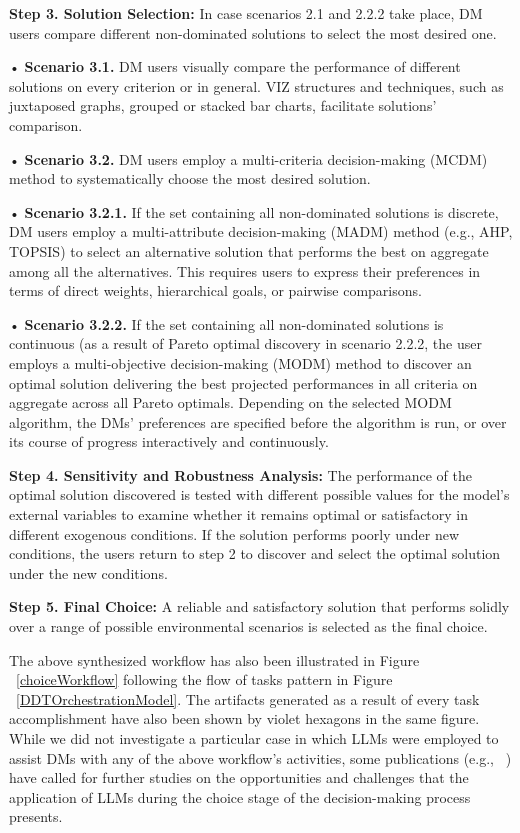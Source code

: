 \documentclass{sfuthesis}
\begin{document}
\textbf{Step 3. Solution Selection:} In case scenarios 2.1 and 2.2.2 take place, DM users compare different non-dominated solutions to select the most desired one.\par
{
\setlength{\leftskip}{0.5cm}
\noindent•	\textbf{Scenario 3.1.} DM users visually compare the performance of different solutions on every criterion or in general. VIZ structures and techniques, such as juxtaposed graphs, grouped or stacked bar charts, facilitate solutions' comparison.\par
\noindent•	\textbf{Scenario 3.2.} DM users employ a multi-criteria decision-making (MCDM) method to systematically choose the most desired solution.\par
}
{
\setlength{\leftskip}{1cm}
\noindent•	\textbf{Scenario 3.2.1.} If the set containing all non-dominated solutions is discrete, DM users employ a multi-attribute decision-making (MADM) method (e.g., AHP, TOPSIS) to select an alternative solution that performs the best on aggregate among all the alternatives. This requires users to express their preferences in terms of direct weights, hierarchical goals, or pairwise comparisons.\par
\noindent•	\textbf{Scenario 3.2.2.} If the set containing all non-dominated solutions is continuous (as a result of Pareto optimal discovery in scenario 2.2.2, the user employs a multi-objective decision-making (MODM) method to discover an optimal solution delivering the best projected performances in all criteria on aggregate across all Pareto optimals. Depending on the selected MODM algorithm, the DMs' preferences are specified before the algorithm is run, or over its course of progress interactively and continuously.\par
}
\textbf{Step 4. Sensitivity and Robustness Analysis:} The performance of the optimal solution discovered is tested with different possible values for the model's external variables to examine whether it remains optimal or satisfactory in different exogenous conditions. If the solution performs poorly under new conditions, the users return to step 2 to discover and select the optimal solution under the new conditions. \par  
\textbf{Step 5. Final Choice:} A reliable and satisfactory solution that performs solidly over a range of possible environmental scenarios is selected as the final choice.\par
The above synthesized workflow has also been illustrated in Figure ~\ref{choiceWorkflow} following the flow of tasks pattern in Figure ~\ref{DDTOrchestrationModel}. The artifacts generated as a result of every task accomplishment have also been shown by violet hexagons in the same figure. While we did not investigate a particular case in which LLMs were employed to assist DMs with any of the above workflow's activities, some publications (e.g., ~\cite{handler_large_2024}) have called for further studies on the opportunities and challenges that the application of LLMs during the choice stage of the decision-making process presents.\par
\end{document}
